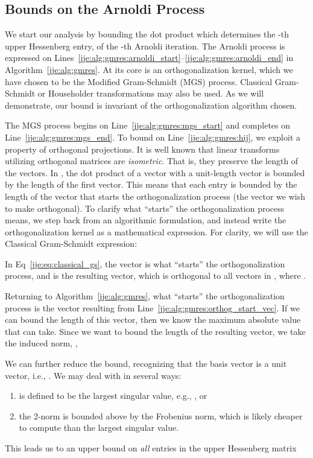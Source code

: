 \subsection{Bounds on the Arnoldi Process}
\label{jje:sec:gmres:bounds}


We start our analysis by bounding the dot product which determines the
-th upper Hessenberg entry,  of the -th Arnoldi
iteration. The Arnoldi process is expressed on
Lines~\ref{jje:alg:gmres:arnoldi_start}--\ref{jje:alg:gmres:arnoldi_end}
in Algorithm~\ref{jje:alg:gmres}.  At its core is an orthogonalization
kernel, which we have chosen to be the Modified Gram-Schmidt (MGS)
process.  Classical Gram-Schmidt or Householder transformations may
also be used.  As we will demonstrate, our bound is invariant of the
orthogonalization algorithm chosen.

The MGS process begins on Line~\ref{jje:alg:gmres:mgs_start} and completes on Line~\ref{jje:alg:gmres:mgs_end}.
To bound  on Line~\ref{jje:alg:gmres:hij}, we exploit a property of
orthogonal projections. It is well known that linear transforms
utilizing orthogonal matrices are \emph{isometric}.  That is, they preserve the
length of the vectors. In , the dot product of a vector with a
unit-length vector is bounded by the length of the first vector.
This means that each  entry is bounded by the length of
the vector that starts the orthogonalization process (the vector we wish to
make orthogonal).
To clarify what ``starts'' the orthogonalization process means, we step back from an algorithmic
formulation, and instead write the orthogonalization kernel as a mathematical
expression.  For clarity, we will use the Classical Gram-Schmidt expression:

In Eq~\eqref{jje:eq:classical_gs}, the vector  is what ``starts''
the orthogonalization process, and  is the resulting vector, which is
orthogonal to all vectors in , where .

Returning to Algorithm~\ref{jje:alg:gmres}, what ``starts'' the
orthogonalization process is the vector resulting from
Line~\ref{jje:alg:gmres:orthog_start_vec}. If we can bound the length of this
vector, then we know the maximum absolute value that  can take.
Since we want to bound the length of the resulting vector, we take the
induced  norm, ,


We can further reduce the bound, recognizing that the basis vector 
is a unit vector, i.e., . We may deal with
 in several ways: 
\begin{enumerate}
  \item 
 is defined to be
the largest singular value, e.g., , or
\item
the 2-norm
is bounded above by the Frobenius norm, which is likely cheaper to compute than
the largest singular value.
\end{enumerate}
 This leads us to an upper bound on \emph{all}
entries in the upper Hessenberg matrix

